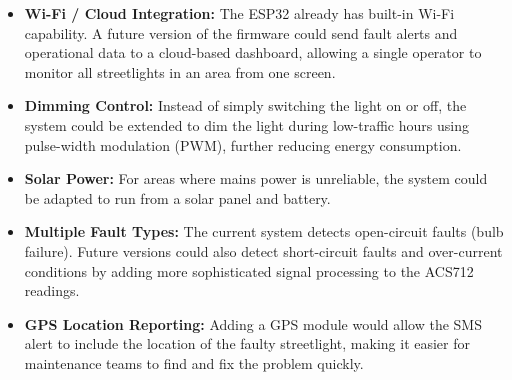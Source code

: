 \documentclass{article}
\begin{document}
\begin{itemize}
    \item \textbf{Wi-Fi / Cloud Integration:} The ESP32 already has built-in Wi-Fi capability. A future version of the firmware could send fault alerts and operational data to a cloud-based dashboard, allowing a single operator to monitor all streetlights in an area from one screen.
    \item \textbf{Dimming Control:} Instead of simply switching the light on or off, the system could be extended to dim the light during low-traffic hours using pulse-width modulation (PWM), further reducing energy consumption.
    \item \textbf{Solar Power:} For areas where mains power is unreliable, the system could be adapted to run from a solar panel and battery.
    \item \textbf{Multiple Fault Types:} The current system detects open-circuit faults (bulb failure). Future versions could also detect short-circuit faults and over-current conditions by adding more sophisticated signal processing to the ACS712 readings.
    \item \textbf{GPS Location Reporting:} Adding a GPS module would allow the SMS alert to include the location of the faulty streetlight, making it easier for maintenance teams to find and fix the problem quickly.
\end{itemize}
\end{document}

